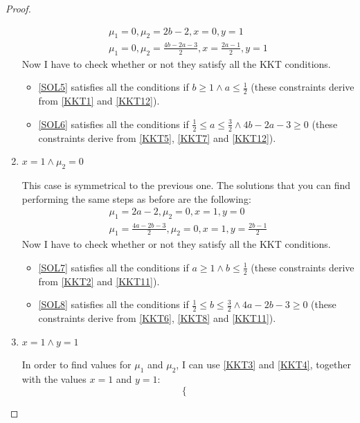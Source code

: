 \begin{proof}
\begin{enumerate}
\begin{gather}
                \mu_1 = 0, \mu_2 = 2b - 2, x = 0, y = 1 \label{SOL5} \tag{SOL5} \\
                \mu_1 = 0, \mu_2 = \frac{4b - 2a - 3}{2}, x = \frac{2a - 1}{2}, y = 1 \label{SOL6} \tag{SOL6}
            \end{gather}
            Now I have to check whether or not they satisfy all the KKT conditions.
            \begin{itemize}
                \item \eqref{SOL5} satisfies all the conditions if \(b \geq 1 \land a \leq \frac{1}{2}\) (these constraints derive from \eqref{KKT1} and \eqref{KKT12}).
                \item \eqref{SOL6} satisfies all the conditions if \(\frac{1}{2} \leq a \leq \frac{3}{2} \land 4b -2a -3 \geq 0\) (these constraints derive from \eqref{KKT5}, \eqref{KKT7} and \eqref{KKT12}).
            \end{itemize}
        \item \(x = 1 \land \mu_2 = 0\)\par
            This case is symmetrical to the previous one. The solutions that you can find performing the same steps as before are the following:
            \begin{gather}
                \mu_1 = 2a - 2, \mu_2 = 0, x = 1, y = 0 \label{SOL7} \tag{SOL7} \\
                \mu_1 = \frac{4a - 2b - 3}{2}, \mu_2 = 0, x = 1, y = \frac{2b - 1}{2} \label{SOL8} \tag{SOL8}
            \end{gather}
            Now I have to check whether or not they satisfy all the KKT conditions.
            \begin{itemize}
                \item \eqref{SOL7} satisfies all the conditions if \(a \geq 1 \land b \leq \frac{1}{2}\) (these constraints derive from \eqref{KKT2} and \eqref{KKT11}).
                \item \eqref{SOL8} satisfies all the conditions if \(\frac{1}{2} \leq b \leq \frac{3}{2} \land 4a -2b -3 \geq 0\) (these constraints derive from \eqref{KKT6}, \eqref{KKT8} and \eqref{KKT11}).
            \end{itemize}
        \item \(x = 1 \land y = 1\)\par
            In order to find values for \(\mu_1\) and \(\mu_2\), I can use \eqref{KKT3} and \eqref{KKT4}, together with the values \(x = 1\) and \(y = 1\):
            \[
                \begin{cases}

\end{cases}\]
\end{enumerate}
\end{proof}
